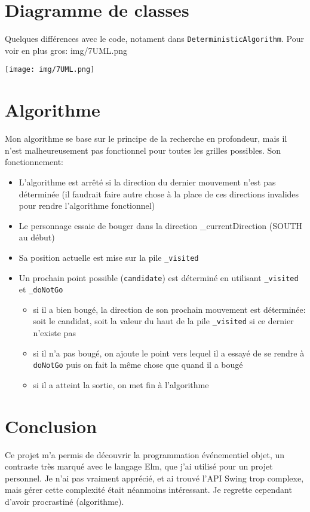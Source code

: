 \documentclass[12pt]{scrartcl}
\begin{document}
\section{Diagramme de classes}
\label{sec:orgc0bfc26}
Quelques différences avec le code, notament dans \texttt{DeterministicAlgorithm}.
Pour voir en plus gros: img/7UML.png
\begin{center}
\texttt{[image: img/7UML.png]}
\end{center}

\section{Algorithme}
\label{sec:org63c12d3}
Mon algorithme se base sur le principe de la recherche en profondeur, mais il n'est malheureusement pas fonctionnel pour toutes les grilles possibles.
Son fonctionnement:
\begin{itemize}
\item L'algorithme est arrêté si la direction du dernier mouvement n'est pas déterminée (il faudrait faire autre chose à la place de ces directions invalides pour rendre l'algorithme fonctionnel)
\item Le personnage essaie de bouger dans la direction \_currentDirection (SOUTH au début)
\item Sa position actuelle est mise sur la pile \texttt{\_visited}
\item Un prochain point possible (\texttt{candidate}) est déterminé en utilisant \texttt{\_visited} et \texttt{\_doNotGo}
\begin{itemize}
\item si il a bien bougé, la direction de son prochain mouvement est déterminée: soit le candidat, soit la valeur du haut de la pile \texttt{\_visited} si ce dernier n'existe pas
\item si il n'a pas bougé, on ajoute le point vers lequel il a essayé  de se rendre à \texttt{doNotGo} puis on fait la même chose que quand il a bougé
\item si il a atteint la sortie, on met fin à l'algorithme
\end{itemize}
\end{itemize}

\section{Conclusion}
\label{sec:orgc6a0915}
Ce projet m'a permis de découvrir la programmation événementiel objet, un contraste
très marqué avec le langage Elm, que j'ai utilisé pour un projet personnel.
Je n'ai pas vraiment apprécié, et ai trouvé l'API Swing trop complexe, mais gérer
cette complexité était néanmoins intéressant.
Je regrette cependant d'avoir procrastiné (algorithme).
\end{document}
